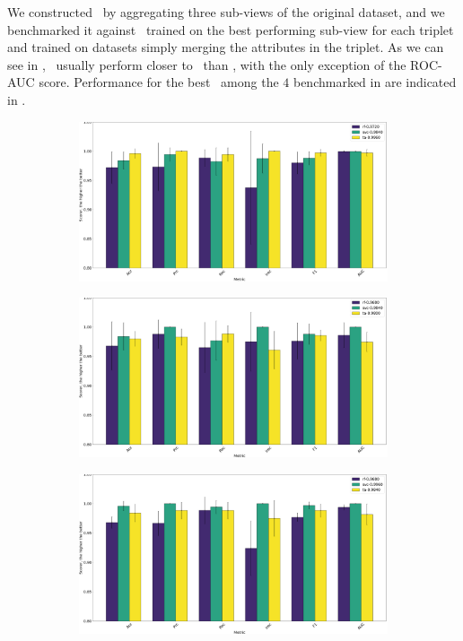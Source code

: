 We constructed \tas\ by aggregating three sub-views of the original dataset, and we benchmarked it
against \rfs\ trained on the best performing sub-view for each triplet and \svcs trained on
datasets simply merging the attributes in the triplet. As we can see in , \tas\ usually perform
closer to \svcs\ than \rfs, with the only exception of the ROC-AUC score. Performance for the best \ta\ among the $4$ benchmarked in  are
indicated in .
\begin{figure}[!h]
	\centering
	\begin{subfigure}{0.49\linewidth}
		\includegraphics[width=\linewidth]{img/An_Bn_Cnmod_ta.png}
		\subcaption{\an, \bn, \cnmod}
	\end{subfigure}
	\begin{subfigure}{0.49\linewidth}
		\includegraphics[width=\linewidth]{img/An_Bn_Phi_ta.png}
		\subcaption{\an, \bn, \phin}
	\end{subfigure}
	\begin{subfigure}{0.49\linewidth}
		\includegraphics[width=\linewidth]{img/An_Cnmod_Phi_ta.png}

\end{subfigure}
\end{figure}
